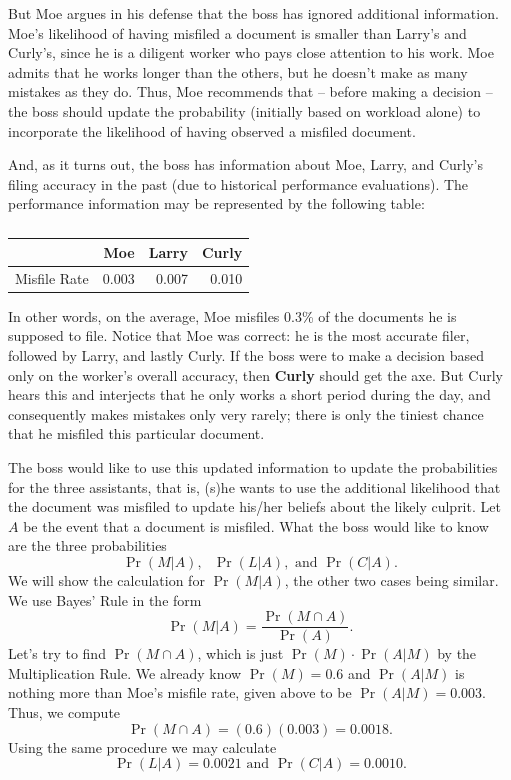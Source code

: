 \documentclass[captions=tableheading]{scrbook}
\begin{document}
\begin{example}
But Moe argues in his defense that the boss has ignored additional information. Moe's likelihood of having misfiled a document is smaller than Larry's and Curly's, since he is a diligent worker who pays close attention to his work. Moe admits that he works longer than the others, but he doesn't make as many mistakes as they do. Thus, Moe recommends that -- before making a decision -- the boss should update the probability (initially based on workload alone) to incorporate the likelihood of having observed a misfiled document.

And, as it turns out, the boss has information about Moe, Larry, and Curly's filing accuracy in the past (due to historical performance evaluations). The performance information may be represented by the following table:

\begin{table}[htb]
\caption[Misfiling assistants: misfile rate]{} 
\begin{center}
\begin{tabular}{lrrr}
               &    Moe  &  Larry  &  Curly  \\
\hline
 Misfile Rate  &  0.003  &  0.007  &  0.010  \\
\end{tabular}
\end{center}
\end{table}


In other words, on the average, Moe misfiles 0.3\% of the documents he is supposed to file. Notice that Moe was correct: he is the most accurate filer, followed by Larry, and lastly Curly. If the boss were to make a decision based only on the worker's overall accuracy, then \textbf{Curly} should get the axe. But Curly hears this and interjects that he only works a short period during the day, and consequently makes mistakes only very rarely; there is only the tiniest chance that he misfiled this particular document.

The boss would like to use this updated information to update the probabilities for the three assistants, that is, (s)he wants to use the additional likelihood that the document was misfiled to update his/her beliefs about the likely culprit. Let \(A\) be the event that a document is misfiled. What the boss would like to know are the three probabilities
\[
\Pr(M|A),\mbox{ }\Pr(L|A),\mbox{ and }\Pr(C|A).
\]
We will show the calculation for \(\Pr(M|A)\), the other two cases being similar. We use Bayes' Rule in the form
\[
\Pr(M|A)=\frac{\Pr(M\cap A)}{\Pr(A)}.
\]
Let's try to find \(\Pr(M\cap A)\), which is just \(\Pr(M)\cdot\Pr(A|M)\) by the Multiplication Rule. We already know \(\Pr(M)=0.6\) and \(\Pr(A|M)\) is nothing more than Moe's misfile rate, given above to be \(\Pr(A|M)=0.003\). Thus, we compute
\[
\Pr(M\cap A)=(0.6)(0.003)=0.0018.
\]
Using the same procedure we may calculate
\[
\Pr(L|A)=0.0021\mbox{ and }\Pr(C|A)=0.0010.
\]


\end{example}
\end{document}
